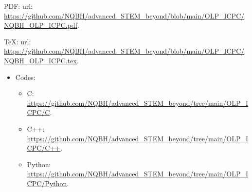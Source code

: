 \documentclass{article}
\begin{document}
\begin{enumerate}
	PDF: {\sc url}: \url{https://github.com/NQBH/advanced_STEM_beyond/blob/main/OLP_ICPC/NQBH_OLP_ICPC.pdf}.
	
	\TeX: {\sc url}: \url{https://github.com/NQBH/advanced_STEM_beyond/blob/main/OLP_ICPC/NQBH_OLP_ICPC.tex}.
	\begin{itemize}
		\item Codes:
		\begin{itemize}
			\item C: \url{https://github.com/NQBH/advanced_STEM_beyond/tree/main/OLP_ICPC/C}.
			\item C++: \url{https://github.com/NQBH/advanced_STEM_beyond/tree/main/OLP_ICPC/C++}.
			\item Python: \url{https://github.com/NQBH/advanced_STEM_beyond/tree/main/OLP_ICPC/Python}.
		\end{itemize}
	\end{itemize}
\end{enumerate}


\printbibliography[heading=bibintoc]
	
\end{document}
